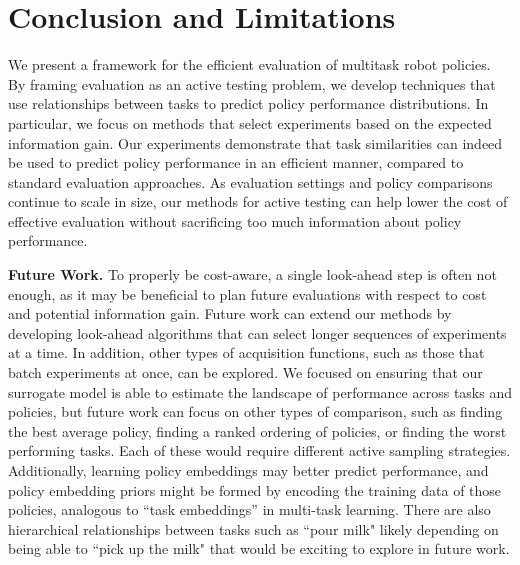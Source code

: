


\section{Conclusion and Limitations}

We present a framework for the efficient evaluation of multitask robot policies. 
By framing evaluation as an active testing problem, we develop techniques that use relationships between tasks to predict policy performance distributions. 
In particular, we focus on methods that select experiments based on the expected information gain.
Our experiments demonstrate that task similarities can indeed be used to predict policy performance in an efficient manner, compared to standard evaluation approaches.
As evaluation settings and policy comparisons continue to scale in size, our methods for active testing can help lower the cost of effective evaluation without sacrificing too much information about policy performance. 


\textbf{Future Work.}
To properly be cost-aware, a single look-ahead step is often not enough, as it may be beneficial to plan future evaluations with respect to cost and potential information gain. 
Future work can extend our methods by developing look-ahead algorithms that can select longer sequences of experiments at a time.
In addition, other types of acquisition functions, such as those that batch experiments at once, can be explored.
We focused on ensuring that our surrogate model is able to estimate the landscape of performance across tasks and policies, but future work can focus on other types of comparison, such as finding the best average policy, finding a ranked ordering of policies, or finding the worst performing tasks. 
Each of these would require different active sampling strategies.
Additionally, learning policy embeddings may better predict performance, and policy embedding priors might be formed by encoding the training data of those policies, analogous to ``task embeddings'' in multi-task learning. 
There are also hierarchical relationships between tasks such as ``pour milk" likely depending on being able to ``pick up the milk" that would be exciting to explore in future work.

